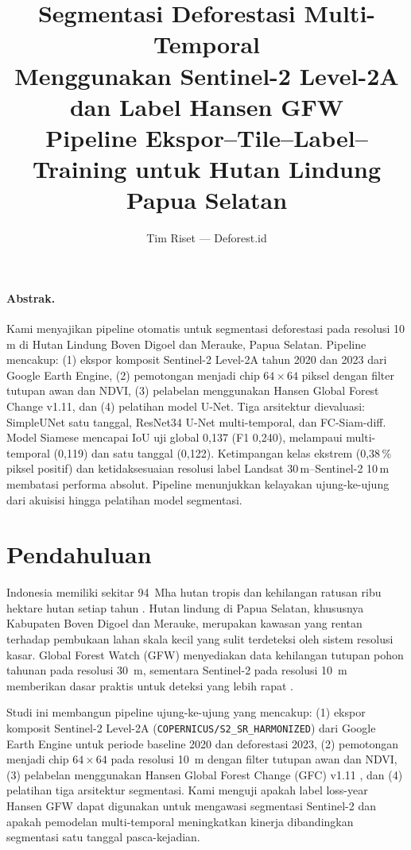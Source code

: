 \documentclass[10pt,a4paper,onecolumn]{article}
\title{\textbf{Segmentasi Deforestasi Multi-Temporal \\
Menggunakan Sentinel-2 Level-2A dan Label Hansen GFW} \\
\small Pipeline Ekspor--Tile--Label--Training untuk Hutan Lindung Papua Selatan}
\author{Tim Riset --- Deforest.id}
\date{}
\begin{document}
\maketitle
\thispagestyle{empty}

\paragraph{Abstrak.}
Kami menyajikan pipeline otomatis untuk segmentasi deforestasi pada
resolusi 10\,m di Hutan Lindung Boven Digoel dan Merauke, Papua Selatan.
Pipeline mencakup: (1) ekspor komposit Sentinel-2 Level-2A tahun 2020
dan 2023 dari Google Earth Engine, (2) pemotongan menjadi chip
$64\times64$ piksel dengan filter tutupan awan dan NDVI, (3) pelabelan
menggunakan Hansen Global Forest Change v1.11, dan (4) pelatihan model
U-Net. Tiga arsitektur dievaluasi: SimpleUNet satu tanggal, ResNet34
U-Net multi-temporal, dan FC-Siam-diff. Model Siamese mencapai IoU uji
global 0,137 (F1 0,240), melampaui multi-temporal (0,119) dan satu
tanggal (0,122). Ketimpangan kelas ekstrem (0,38\,\% piksel positif) dan
ketidaksesuaian resolusi label Landsat 30\,m--Sentinel-2 10\,m membatasi
performa absolut. Pipeline menunjukkan kelayakan ujung-ke-ujung dari
akuisisi hingga pelatihan model segmentasi.

\section{Pendahuluan}
Indonesia memiliki sekitar 94~Mha hutan tropis dan kehilangan ratusan
ribu hektare hutan setiap tahun \cite{hansen2013high}. Hutan lindung di
Papua Selatan, khususnya Kabupaten Boven Digoel dan Merauke, merupakan
kawasan yang rentan terhadap pembukaan lahan skala kecil yang sulit
terdeteksi oleh sistem resolusi kasar. Global Forest Watch (GFW)
menyediakan data kehilangan tutupan pohon tahunan pada resolusi 30~m,
sementara Sentinel-2 pada resolusi 10~m memberikan dasar praktis untuk
deteksi yang lebih rapat \cite{drusch2012sentinel2}.

Studi ini membangun pipeline ujung-ke-ujung yang mencakup: (1) ekspor
komposit Sentinel-2 Level-2A (\texttt{COPERNICUS/S2\_SR\_HARMONIZED})
dari Google Earth Engine \cite{gorelick2017gee} untuk periode baseline
2020 dan deforestasi 2023, (2) pemotongan menjadi chip $64\times64$ pada
resolusi 10~m dengan filter tutupan awan dan NDVI, (3) pelabelan
menggunakan Hansen Global Forest Change (GFC) v1.11 \cite{hansen2013high},
dan (4) pelatihan tiga arsitektur segmentasi. Kami menguji apakah label
loss-year Hansen GFW dapat digunakan untuk mengawasi segmentasi
Sentinel-2 dan apakah pemodelan multi-temporal meningkatkan kinerja
dibandingkan segmentasi satu tanggal pasca-kejadian.
\end{document}
